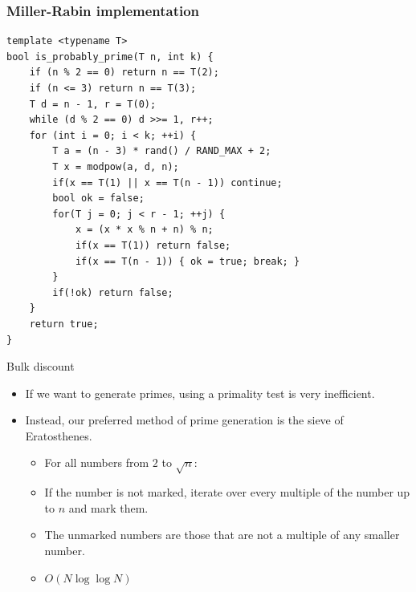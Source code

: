\documentclass{beamer}
\begin{document}
\begin{frame}
\frametitle{Miller-Rabin implementation}

\begin{small}
\begin{verbatim}
template <typename T>
bool is_probably_prime(T n, int k) {
    if (n % 2 == 0) return n == T(2);
    if (n <= 3) return n == T(3);
    T d = n - 1, r = T(0);
    while (d % 2 == 0) d >>= 1, r++;
    for (int i = 0; i < k; ++i) {
        T a = (n - 3) * rand() / RAND_MAX + 2;
        T x = modpow(a, d, n);
        if(x == T(1) || x == T(n - 1)) continue;
        bool ok = false;
        for(T j = 0; j < r - 1; ++j) {
            x = (x * x % n + n) % n;
            if(x == T(1)) return false;
            if(x == T(n - 1)) { ok = true; break; }
        }
        if(!ok) return false;
    }
    return true;
}
\end{verbatim}
\end{small}

\end{frame}

\begin{frame}{Bulk discount}
  \begin{itemize}
    \item If we want to generate primes, using a primality test is very inefficient.
    \item Instead, our preferred method of prime generation is the sieve of Eratosthenes.
      \begin{itemize}
        \item For all numbers from $2$ to $\sqrt{n}$:
        \item If the number is not marked, iterate over every multiple of the
          number up to $n$ and mark them.
        \item The unmarked numbers are those that are not a multiple of any
          smaller number.
        \item $O(N\log \log N)$
      \end{itemize}
  \end{itemize}
\end{frame}
\end{document}
